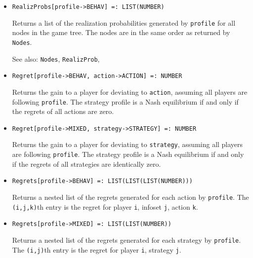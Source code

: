 \begin{itemize}
\item{}
\protect \large \begin{verbatim}
RealizProbs[profile->BEHAV] =: LIST(NUMBER) 
\end{verbatim}\normalsize

\bd

Returns a list of the realization probabilities generated by
\verb+profile+ for all nodes in the game tree.  The nodes are in the
same order as returned by \verb+Nodes+.
\item [See also:] \verb+Nodes+, \verb+RealizProb+, 
\ed

\item{}
\protect \large \begin{verbatim}
Regret[profile->BEHAV, action->ACTION] =: NUMBER 
\end{verbatim} \normalsize

\bd
Returns the gain to a player for deviating to \verb+action+, assuming
all players are following \verb+profile+.  The strategy profile is
a Nash equilibrium if and only if the regrets of all actions are zero.
\ed

\item{}
\protect \large \begin{verbatim}
Regret[profile->MIXED, strategy->STRATEGY] =: NUMBER 
\end{verbatim} \normalsize

\bd
Returns the gain to a player for deviating to \verb+strategy+, assuming
all players are following \verb+profile+.  The strategy profile is
a Nash equilibrium if and only if the regrets of all strategies are
identically zero.
\ed

\item{}
\protect \large \begin{verbatim}
Regrets[profile->BEHAV] =: LIST(LIST(LIST(NUMBER))) 
\end{verbatim} \normalsize

\bd
Returns a nested list of the regrets generated for each action by
\verb+profile+.  The \verb+(i,j,k)+th entry is the regret for player
\verb+i+, infoset \verb+j+, action \verb+k+.
\ed

\item{}
\protect \large \begin{verbatim}
Regrets[profile->MIXED] =: LIST(LIST(NUMBER)) 
\end{verbatim} \normalsize

\bd
Returns a nested list of the regrets generated for each strategy by
\verb+profile+.  The \verb+(i,j)+th entry is the regret for player
\verb+i+, strategy \verb+j+.
\ed


\end{itemize}
